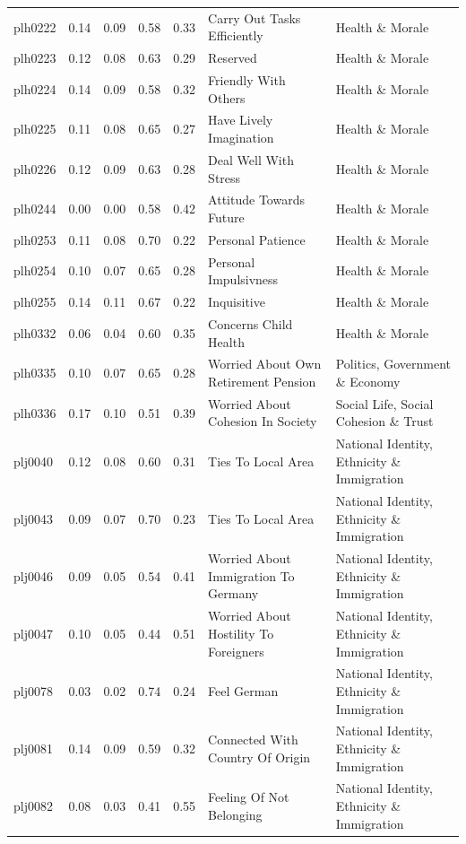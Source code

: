 \documentclass[
  12pt,
]{article}
\begin{document}
\begin{landscape}
\begin{scriptsize}
\begin{longtable}{|p{1.75in}|p{0.3in}|p{0.3in}|p{0.3in}|p{0.3in}|p{2.5in}|p{2.5in}}
plh0222 & 0.14 & 0.09 & 0.58 & 0.33 & Carry Out Tasks Efficiently & Health \& Morale \\ 
plh0223 & 0.12 & 0.08 & 0.63 & 0.29 & Reserved & Health \& Morale \\ 
plh0224 & 0.14 & 0.09 & 0.58 & 0.32 & Friendly With Others & Health \& Morale \\ 
plh0225 & 0.11 & 0.08 & 0.65 & 0.27 & Have Lively Imagination & Health \& Morale \\ 
plh0226 & 0.12 & 0.09 & 0.63 & 0.28 & Deal Well With Stress & Health \& Morale \\ 
plh0244 & 0.00 & 0.00 & 0.58 & 0.42 & Attitude Towards Future & Health \& Morale \\ 
plh0253 & 0.11 & 0.08 & 0.70 & 0.22 & Personal Patience & Health \& Morale \\ 
plh0254 & 0.10 & 0.07 & 0.65 & 0.28 & Personal Impulsivness & Health \& Morale \\ 
plh0255 & 0.14 & 0.11 & 0.67 & 0.22 & Inquisitive & Health \& Morale \\ 
plh0332 & 0.06 & 0.04 & 0.60 & 0.35 & Concerns Child Health & Health \& Morale \\ 
plh0335 & 0.10 & 0.07 & 0.65 & 0.28 & Worried About Own Retirement Pension & Politics, Government \& Economy \\ 
plh0336 & 0.17 & 0.10 & 0.51 & 0.39 & Worried About Cohesion In Society & Social Life, Social Cohesion \& Trust \\ 
plj0040 & 0.12 & 0.08 & 0.60 & 0.31 & Ties To Local Area & National Identity, Ethnicity \& Immigration \\ 
plj0043 & 0.09 & 0.07 & 0.70 & 0.23 & Ties To Local Area & National Identity, Ethnicity \& Immigration \\ 
plj0046 & 0.09 & 0.05 & 0.54 & 0.41 & Worried About Immigration To Germany & National Identity, Ethnicity \& Immigration \\ 
plj0047 & 0.10 & 0.05 & 0.44 & 0.51 & Worried About Hostility To Foreigners & National Identity, Ethnicity \& Immigration \\ 
plj0078 & 0.03 & 0.02 & 0.74 & 0.24 & Feel German & National Identity, Ethnicity \& Immigration \\ 
plj0081 & 0.14 & 0.09 & 0.59 & 0.32 & Connected With Country Of Origin & National Identity, Ethnicity \& Immigration \\ 
plj0082 & 0.08 & 0.03 & 0.41 & 0.55 & Feeling Of Not Belonging & National Identity, Ethnicity \& Immigration \\ 

\end{longtable}
\end{scriptsize}
\end{landscape}
\end{document}
